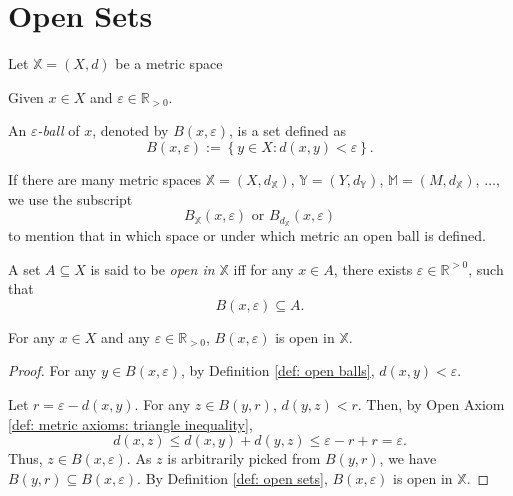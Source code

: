 

\section{Open Sets}


\begin{definition}
	\label{def: open balls}
	
	Let $\mathbb X = (X, d)$ be a metric space
	
	Given $x \in X$ and $\varepsilon \in \mathbb R_{> 0}$.
	
	An \textit{$\varepsilon$-ball} of $x$, denoted by $B(x, \varepsilon)$, is a set defined as
	$$
	B(x, \varepsilon) := \left\{ y \in X : d(x,y) < \varepsilon \right\}.
	$$
\end{definition}


\begin{note}
	\label{note: open balls: notation}
	If there are many metric spaces $\mathbb X = (X, d_\mathbb X)$, $\mathbb Y = (Y, d_\mathbb Y)$, $\mathbb M = (M, d_\mathbb X)$, $\ldots,$ we use the subscript
	$$
	B_{\mathbb X}(x , \varepsilon) \text{ or } B_{d_\mathbb X} (x, \varepsilon)
	$$
	to mention that in which space or under which metric an open ball is defined.
\end{note}


\begin{definition}
	\label{def: open sets}
	A set $A \subseteq X$ is said to be \textit{open in $\mathbb X$} iff for any $x \in A$, there exists $\varepsilon \in \mathbb R^{> 0}$, such that
	$$
	B(x, \varepsilon) \subseteq A.
	$$
\end{definition}


\begin{lemma}
	\label{lm: open balls are open} For any $x \in X$ and any $\varepsilon \in \mathbb R_{>0}$, $B(x, \varepsilon)$ is open in $\mathbb X$.
	
	\begin{proof}
		For any $y \in B(x, \varepsilon)$, by Definition \ref{def: open balls}, $d(x,y) < \varepsilon$.
		
		Let $r = \varepsilon - d(x,y)$. For any $z \in B(y, r)$, $d(y, z) < r$. Then, by Open Axiom \ref{def: metric axioms: triangle inequality},
		$$
		d(x,z) \le d(x, y) + d(y,z) \le \varepsilon - r + r = \varepsilon.
		$$
		Thus, $z \in B(x, \varepsilon)$. As $z$ is arbitrarily picked from $B(y, r)$, we have $B(y, r) \subseteq B(x, \varepsilon)$. By Definition \ref{def: open sets}, $B(x, \varepsilon)$ is open in $\mathbb X$.
	\end{proof}
\end{lemma}



